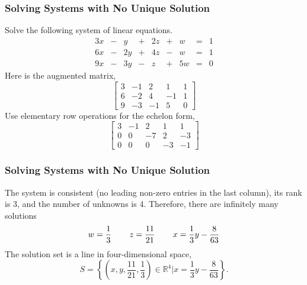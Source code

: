 \documentclass[xcolor=dvipsnames]{beamer}
\begin{document}
\begin{frame}
  \frametitle{Solving Systems with No Unique Solution}
  Solve the following system of linear equations.
  \begin{equation}
    \label{eq:lahpuwis}
    \begin{array}{ccccccccc}
      3x & - & y & + & 2z & + & w & = & 1 \\
      6x & - & 2y & + & 4z & - & w & = & 1 \\
      9x & - & 3y & - & z & + & 5w & = & 0
    \end{array}
  \end{equation}
  Here is the augmented matrix,
  \begin{equation}
    \label{eq:iecoyaem}
    \left[
      \begin{array}{ccccc}
        3 & -1 & 2 & 1 & 1 \\
        6 & -2 & 4 & -1 & 1 \\
        9 & -3 & -1 & 5 & 0
      \end{array}\right]
  \end{equation}
Use elementary row operations for the echelon form,
  \begin{equation}
    \label{eq:orieteeb}
    \left[
      \begin{array}{ccccc}
        3 & -1 & 2 & 1 & 1 \\
        0 & 0 & -7 & 2 & -3 \\
        0 & 0 & 0 & -3 & -1
      \end{array}\right]
  \end{equation}
\end{frame}

\begin{frame}
  \frametitle{Solving Systems with No Unique Solution}
  The system is consistent (no leading non-zero entries in the last
  column), its rank is 3, and the number of unknowns is 4. Therefore,
  there are infinitely many solutions
  \begin{equation}
    \label{eq:giekeati}
      w=\frac{1}{3}\hspace{.3in}z=\frac{11}{21}\hspace{.3in}x=\frac{1}{3}y-\frac{8}{63}
  \end{equation}
  The solution set is a line in four-dimensional space,
  \begin{equation}
    \label{eq:ohsiepun}
S=\left\{\left(x,y,\frac{11}{21},\frac{1}{3}\right)\in\mathbb{R}^{4}\vert{}x=\frac{1}{3}y-\frac{8}{63}\right\}.
  \end{equation}
\end{frame}
\end{document}
